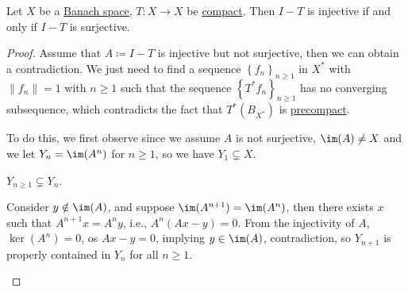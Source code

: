 \begin{theorem}\label{thm:Fredholm-alternative}
	Let \(X\) be a \hyperref[def:Banach-space]{Banach space}, \(T\colon X\to  X\) be \hyperref[def:compact-op]{compact}. Then \(I - T\) is injective if and only if \(I - T\) is surjective.
\end{theorem}
\begin{proof}
	Assume that \(A\coloneqq I - T\) is injective but not surjective, then we can obtain a contradiction. We just need to find a sequence \(\left\{ f_{n}  \right\}_{n\geq 1} \) in \(X^{\ast} \) with \(\lVert f_{n}  \rVert = 1\) with \(n\geq 1\) such that the sequence \(\left\{ T^{\ast} f_n \right\}_{n\geq 1} \) has no converging subsequence, which contradicts the fact that \(T^{\ast} (B_{X^{\ast} })\) is \hyperref[def:precompact]{precompact}.

	To do this, we first observe since we assume \(A\) is not surjective, \(\im(A) \neq X\) and we let \(Y_n = \im(A^n)\) for \(n\geq 1\), so we have \(Y_1 \subsetneq X\).
	\begin{claim}
		\(Y_{n\geq 1} \subsetneq Y_n\).
	\end{claim}
	\begin{explanation}
		Consider \(y \notin \im(A)\), and suppose \(\im(A^{n+1})= \im(A^n)\), then there exists \(x\) such that \(A^{n+1}x = A^n y\), i.e., \(A^n (Ax - y) = 0\). From the injectivity of \(A\), \(\ker(A^n) = 0\), os \(Ax - y = 0\), implying \(y\in \im(A)\), contradiction, so \(Y_{n+1}\) is properly contained in \(Y_n\) for all \(n\geq 1\).
	\end{explanation}


\end{proof}
